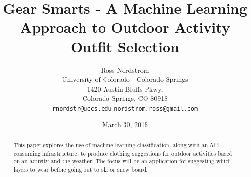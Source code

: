 \documentclass{sig-alternate}
\begin{document}
\title{Gear Smarts - A Machine Learning Approach to Outdoor Activity Outfit Selection}
\author{Ross Nordstrom\\
        University of Colorado - Colorado Springs\\
        1420 Austin Bluffs Pkwy,\\
        Colorado Springs, CO 80918\\
        \texttt{rnordstr@uccs.edu}
        \texttt{nordstrom.ross@gmail.com}
       }
\date{March 30, 2015}

\maketitle

\begin{abstract}
This paper explores the use of machine learning classification, along with an API-consuming infrastructure, to
produce clothing suggestions for outdoor activities based on an activity and the weather. The focus will be an
application for suggesting which layers to wear before going out to ski or snow board.
\end{abstract}







% 
% 
% 

{}



\end{document}
